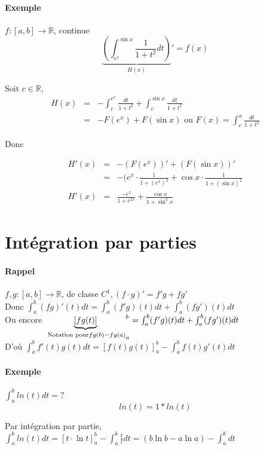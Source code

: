 	\paragraph{Exemple} $f:[a, b] \rightarrow \mathbb{R}$, continue \[\underbrace{(\int_{e^x}^{\sin x} \frac{1}{1+t^2} dt)}_{H(x)}' = f(x)\]

	Soit $c \in \mathbb{R}$, \[\begin{array}{rclr}
		H(x) &=& -\int^{e^x}_c \frac{dt}{1+t^2} + \int_c^{\sin x} \frac{dt}{1+t^2} \\
				   &=& -F(e^x) + F(\sin x) \text{ ou } F(x) = \int_c^x \frac{dt}{1+t^2} \end{array}\]

	\begin{center}
		Donc
	\end{center}
	\[\begin{array}{rcl}
			H'(x) &=& -(F(e^x))' + (F(\sin x))' \\
						   &=& - (e^x \cdot \frac{1}{1+(e^x)^2} + \cos x \cdot \frac{1}{1+(\sin x)^2} \\
	H'(x) &=& \frac{-e^x}{1+e^{2x}} + \frac{\cos x}{1+\sin^2 x} \end{array}\]

			\section{Intégration par parties}

			\paragraph{Rappel} $f, g : [a, b] \rightarrow \mathbb{R}$, de classe $C^1, (f\cdot g)' = f'g+fg'$ ~\\
			Donc $\int_a^b (fg)'(t)dt = \int_a^b(f'g)(t)dt + \int_a^b(fg')(t)dt$ ~\\
			Ou encore ${\underbrace{[fg(t)]}_{\text{ Notation pour} ~\\ fg(b) - fg(a) } }^b_a = \int_a^b(f'g)(t)dt + \int_a^b(fg')(t)dt$ ~\\

			D'où $\int_a^b f'(t)g(t)dt = [f(t)g(t)]_a^b - \int_a^b f(t)g'(t)dt$

			\paragraph{Exemple} $\int_a^b ln(t)dt = ?$ \[ln(t) = 1 * ln(t)\]

		Par intégration par partie, $\int_a^b ln(t)dt = [t\cdot \ln t]^b_a - \int_a^b \frac{t}{t}dt = (b \ln b - a \ln a) - \int_a^b dt$

